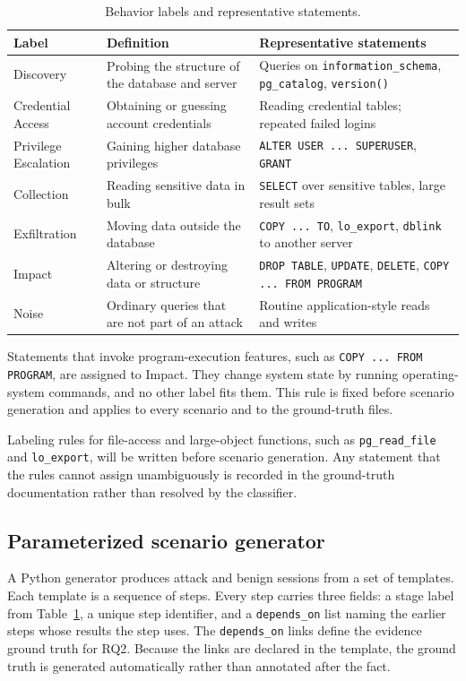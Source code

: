 \documentclass[12pt,a4paper]{report}
\begin{document}
\begin{table}[h]
\centering
\caption{Behavior labels and representative statements.}
\label{tab:labels}
\begin{tabular}{p{2.8cm} p{5.6cm} p{4.1cm}}
\hline
Label & Definition & Representative statements \\
\hline
Discovery & Probing the structure of the database and server & Queries on \texttt{information\_schema}, \texttt{pg\_catalog}, \texttt{version()} \\
Credential Access & Obtaining or guessing account credentials & Reading credential tables; repeated failed logins \\
Privilege Escalation & Gaining higher database privileges & \texttt{ALTER USER ... SUPERUSER}, \texttt{GRANT} \\
Collection & Reading sensitive data in bulk & \texttt{SELECT} over sensitive tables, large result sets \\
Exfiltration & Moving data outside the database & \texttt{COPY ... TO}, \texttt{lo\_export}, \texttt{dblink} to another server \\
Impact & Altering or destroying data or structure & \texttt{DROP TABLE}, \texttt{UPDATE}, \texttt{DELETE}, \texttt{COPY ... FROM PROGRAM} \\
Noise & Ordinary queries that are not part of an attack & Routine application-style reads and writes \\
\hline
\end{tabular}
\end{table}

Statements that invoke program-execution features, such as \texttt{COPY ... FROM PROGRAM}, are assigned to Impact. They change system state by running operating-system commands, and no other label fits them. This rule is fixed before scenario generation and applies to every scenario and to the ground-truth files.

Labeling rules for file-access and large-object functions, such as \texttt{pg\_read\_file} and \texttt{lo\_export}, will be written before scenario generation. Any statement that the rules cannot assign unambiguously is recorded in the ground-truth documentation rather than resolved by the classifier.

\subsection{Parameterized scenario generator}
A Python generator produces attack and benign sessions from a set of templates. Each template is a sequence of steps. Every step carries three fields: a stage label from Table~\ref{tab:labels}, a unique step identifier, and a \texttt{depends\_on} list naming the earlier steps whose results the step uses. The \texttt{depends\_on} links define the evidence ground truth for RQ2. Because the links are declared in the template, the ground truth is generated automatically rather than annotated after the fact.
\end{document}
